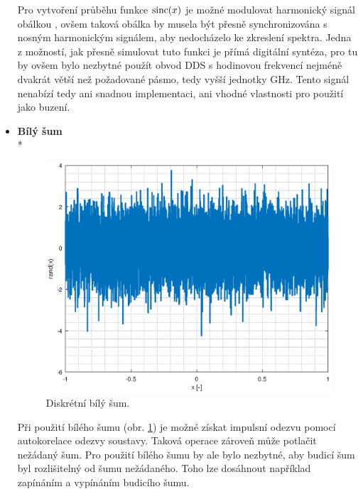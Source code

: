 \begin{itemize}
	Pro vytvoření průběhu funkce $\operatorname{sinc}(x)$ je možné modulovat harmonický signál obálkou \cite{sincgausstdr}, ovšem taková obálka by musela být přesně synchronizována s nosným harmonickým signálem, aby nedocházelo ke zkreslení spektra. Jedna z možností, jak přesně simulovat tuto funkci je přímá digitální syntéza, pro tu by ovšem bylo nezbytné použít obvod \acrshort{DDS} s hodinovou frekvencí nejméně dvakrát větší než požadované pásmo, tedy vyšší jednotky GHz. Tento signál nenabízí tedy ani snadnou implementaci, ani vhodné vlastnosti pro použití jako buzení.
	
	\item
	\textbf{Bílý šum}\\*	
	\begin{figure}[htbp]\includegraphics[width=\textwidth,keepaspectratio]{images/whitenoise.eps}\caption{Diskrétní bílý šum.}\label{whitenoise}\end{figure}			
	Při použití bílého šumu (obr. \ref{whitenoise}) je možné získat impulsní odezvu pomocí autokorelace odezvy soustavy. Taková operace zároveň může potlačit nežádaný šum. Pro použití bílého šumu by ale bylo nezbytné, aby budicí šum byl rozlišitelný od šumu nežádaného. Toho lze dosáhnout například zapínáním a vypínáním budicího šumu.
	

\end{itemize}
